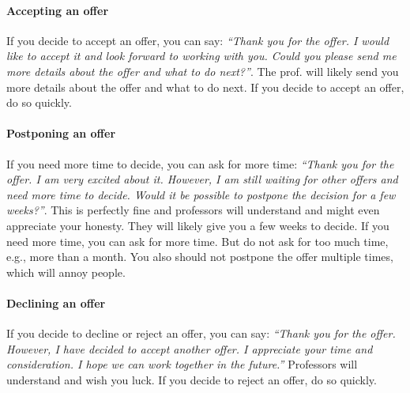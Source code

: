 \documentclass[oneside,11pt]{book}
\begin{document}
\paragraph{Accepting an offer} If you decide to accept an offer, you can say: \emph{``Thank you for the offer.  I would like to accept it and look forward to working with you.  Could you please send me more details about the offer and what to do next?''}. The prof. will likely send you more details about the offer and what to do next.  If you decide to accept an offer, do so quickly.



\paragraph{Postponing an offer} If you need more time to decide, you can ask for more time: \emph{``Thank you for the offer.  I am very excited about it.  However, I am still waiting for other offers and need more time to decide.  Would it be possible to postpone the decision for a few weeks?''}.  This is perfectly fine and professors will understand and might even appreciate your honesty.  They will likely give you a few weeks to decide.  If you need more time, you can ask for more time.  But do not ask for too much time, e.g., more than a month.  You also should not postpone the offer multiple times, which will annoy people.



\paragraph{Declining an offer} If you decide to decline or reject an offer, you can say: \emph{``Thank you for the offer. However, I have decided to accept another offer.  I appreciate your time and consideration.  I hope we can work together in the future.''}  Professors will understand and wish you luck.  If you decide to reject an offer, do so quickly.
\end{document}
